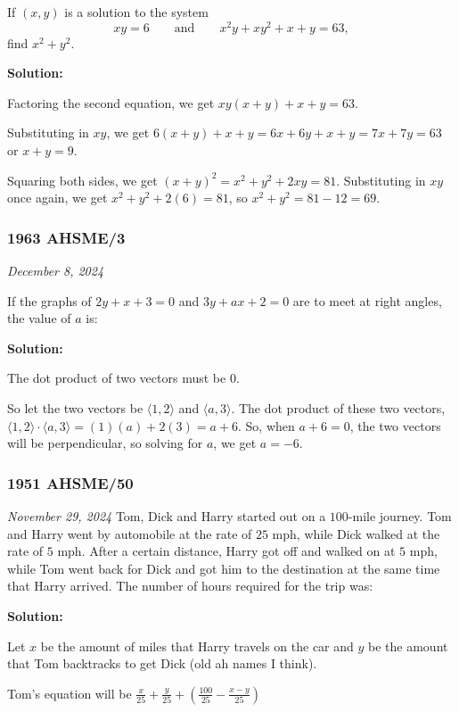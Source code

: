 \documentclass[../mathproblems.tex]{subfiles}
\begin{document}
If $(x, y)$ is a solution to the system
\[ xy=6 \qquad \text{and} \qquad x^2y+xy^2+x+y=63, \]find $x^2+y^2.$

\textbf{Solution:}

Factoring the second equation, we get $xy(x+y)+x+y=63$.

Substituting in $xy$, we get $6(x+y)+x+y = 6x+6y+x+y = 7x+7y = 63$ or $x+y=9$.

Squaring both sides, we get $(x+y)^2 = x^2+y^2+2xy = 81$. Substituting in $xy$ once again, we get $x^2+y^2+2(6)=81$, so $x^2+y^2=81-12=69$.

\noindent\hrulefill

\subsubsection*{1963 AHSME/3}
\textit{December 8, 2024}

If the graphs of $2y+x+3=0$ and $3y+ax+2=0$ are to meet at right angles, the value of $a$ is:

\textbf{Solution:}

The dot product of two vectors must be $0$.

So let the two vectors be $\langle 1,2 \rangle$ and $\langle a,3\rangle$. The dot product of these two vectors, $\langle 1,2\rangle \cdot \langle a,3\rangle = (1)(a) + 2(3) = a+6$. So, when $a+6=0$, the two vectors will be perpendicular, so solving for $a$, we get $a=\boxed{-6}$.

\noindent\hrulefill



\subsubsection*{1951 AHSME/50} 
\textit{November 29, 2024}
Tom, Dick and Harry started out on a $100$-mile journey. Tom and Harry went by automobile at the rate of $25$ mph, while Dick walked at the rate of $5$ mph. After a certain distance, Harry got off and walked on at $5$ mph, while Tom went back for Dick and got him to the destination at the same time that Harry arrived. The number of hours required for the trip was:

\textbf{Solution:}

Let $x$ be the amount of miles that Harry travels on the car and $y$ be the amount that Tom backtracks to get Dick (old ah names I think).

Tom's equation will be $\frac{x}{25}+\frac{y}{25} + \left(\frac{100}{25}-\frac{x-y}{25}\right)$
\end{document}
